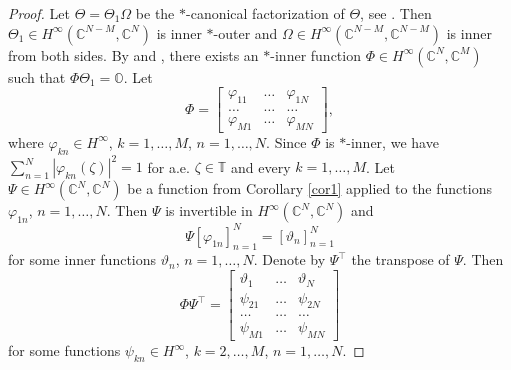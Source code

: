 \documentclass[a4paper,oneside,11pt]{amsart}
\numberwithin{equation}{section}
\theoremstyle{plain}
\theoremstyle{definition}
\begin{document}
\begin{proof} Let $\Theta=\Theta_1\Omega$ be the $*$-canonical factorization of $\Theta$, see {\cite[(V.4.20)]{sznfbk}}. 
Then $\Theta_1\in  H^\infty(\mathbb C^{N-M}, \mathbb C^N)$ is inner $*$-outer 
and $\Omega\in H^\infty(\mathbb C^{N-M}, \mathbb C^{N-M})$ is inner from both sides. By \cite{sznf74} and \cite{tak}, there exists an 
 $*$-inner 
function $\Phi\in H^\infty(\mathbb C^N, \mathbb C^M)$ such that $\Phi\Theta_1=\mathbb O$. Let
\begin{equation*}\Phi=\left[\begin{matrix} \varphi_{11} & \ldots & \varphi_{1N}\\ 
 \ldots & \ldots & \ldots \\ \varphi_{M1} & \ldots & \varphi_{MN}\end{matrix}\right], 
\end{equation*}
where $\varphi_{kn}\in H^\infty$, $k=1,\ldots, M$, $n=1,\ldots, N$. Since $\Phi$ is $*$-inner, we have 
$\sum_{n=1}^N|\varphi_{kn}(\zeta)|^2=1$ for a.e. $\zeta\in\mathbb T$ and every $k=1,\ldots, M$. 
Let
 $\Psi\in H^\infty(\mathbb C^N, \mathbb C^N)$ be a function from Corollary \ref{cor1} applied to the 
functions $\varphi_{1n}$,  $n=1,\ldots, N$. Then $\Psi$ is invertible in $H^\infty(\mathbb C^N, \mathbb C^N)$ and 
\begin{equation*} \Psi[\varphi_{1n}]_{n=1}^N=[\vartheta_n]_{n=1}^N
\end{equation*}
for some inner functions $\vartheta_n$, $n=1,\ldots, N$.
Denote by $\Psi^\top$ the transpose of $\Psi$. Then 
\begin{equation*}
\Phi\Psi^\top=\left[\begin{matrix} \vartheta_1 & \ldots & \vartheta_N\\ 
  \psi_{21} & \ldots & \psi_{2N}\\ 
 \ldots & \ldots & \ldots \\ \psi_{M1} & \ldots & \psi_{MN}\end{matrix}\right]
\end{equation*}
for some functions $\psi_{kn}\in H^\infty$, $k=2,\ldots, M$, $n=1,\ldots, N$.


\end{proof}
\end{document}
